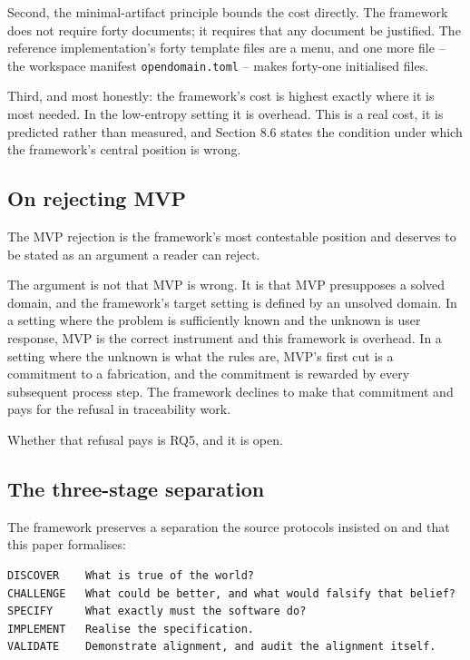 \documentclass[11pt,a4paper]{article}
\begin{document}
Second, the minimal-artifact principle bounds the cost directly. The framework does not require forty documents; it requires that any document be justified. The reference implementation's forty template files are a menu, and one more file -- the workspace manifest \texttt{opendomain.toml} -- makes forty-one initialised files.

Third, and most honestly: the framework's cost is highest exactly where it is most needed. In the low-entropy setting it is overhead. This is a real cost, it is predicted rather than measured, and Section 8.6 states the condition under which the framework's central position is wrong.

\subsection{On rejecting MVP}

The MVP rejection is the framework's most contestable position and deserves to be stated as an argument a reader can reject.

The argument is not that MVP is wrong. It is that MVP presupposes a solved domain, and the framework's target setting is defined by an unsolved domain. In a setting where the problem is sufficiently known and the unknown is user response, MVP is the correct instrument and this framework is overhead. In a setting where the unknown is what the rules are, MVP's first cut is a commitment to a fabrication, and the commitment is rewarded by every subsequent process step. The framework declines to make that commitment and pays for the refusal in traceability work.

Whether that refusal pays is RQ5, and it is open.

\subsection{The three-stage separation}

The framework preserves a separation the source protocols insisted on and that this paper formalises:

\begin{Verbatim}[fontsize=\footnotesize,breaklines=true,breakanywhere=true,breakautoindent=false,samepage=false]
DISCOVER    What is true of the world?
CHALLENGE   What could be better, and what would falsify that belief?
SPECIFY     What exactly must the software do?
IMPLEMENT   Realise the specification.
VALIDATE    Demonstrate alignment, and audit the alignment itself.
\end{Verbatim}
\end{document}
